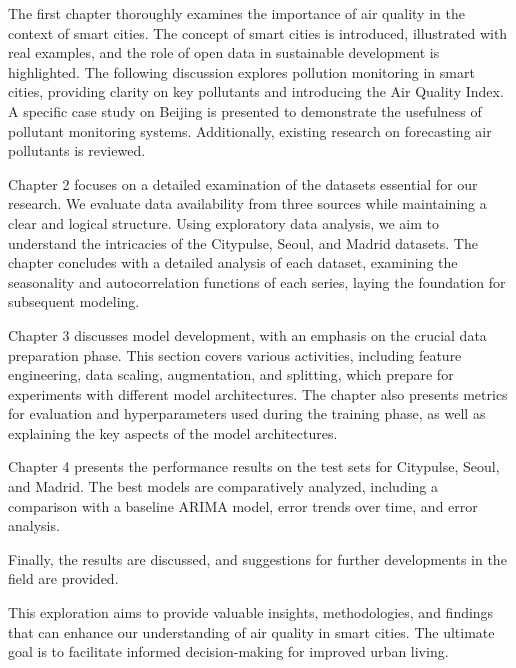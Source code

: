 The first chapter thoroughly examines the importance of air quality in the context of smart cities. The concept of smart cities is introduced, illustrated with real examples, and the role of open data in sustainable development is highlighted. The following discussion explores pollution monitoring in smart cities, providing clarity on key pollutants and introducing the Air Quality Index. A specific case study on Beijing is presented to demonstrate the usefulness of pollutant monitoring systems. Additionally, existing research on forecasting air pollutants is reviewed.

Chapter 2 focuses on a detailed examination of the datasets essential for our research. We evaluate data availability from three sources while maintaining a clear and logical structure. Using exploratory data analysis, we aim to understand the intricacies of the Citypulse, Seoul, and Madrid datasets. The chapter concludes with a detailed analysis of each dataset, examining the seasonality and autocorrelation functions of each series, laying the foundation for subsequent modeling.

Chapter 3 discusses model development, with an emphasis on the crucial data preparation phase. This section covers various activities, including feature engineering, data scaling, augmentation, and splitting, which prepare for experiments with different model architectures. The chapter also presents metrics for evaluation and hyperparameters used during the training phase, as well as explaining the key aspects of the model architectures. 

Chapter 4 presents the performance results on the test sets for Citypulse, Seoul, and Madrid. The best models are comparatively analyzed, including a comparison with a baseline ARIMA model, error trends over time, and error analysis. 

Finally, the results are discussed, and suggestions for further developments in the field are provided.

This exploration aims to provide valuable insights, methodologies, and findings that can enhance our understanding of air quality in smart cities. The ultimate goal is to facilitate informed decision-making for improved urban living.